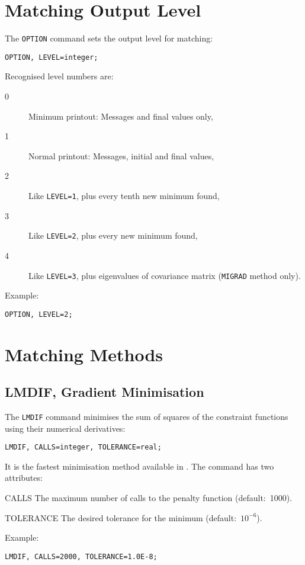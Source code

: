 \section{Matching Output Level}
\label{sec:matchoption}
The \texttt{OPTION} command sets the output level for matching:
\begin{verbatim}
OPTION, LEVEL=integer;
\end{verbatim}
Recognised level numbers are:
\begin{description}
\item[0]
Minimum printout: Messages and final values only,
\item[1]
Normal printout: Messages, initial and final values,
\item[2]
Like \texttt{LEVEL=1}, plus every tenth new minimum found,
\item[3]
Like \texttt{LEVEL=2}, plus every new minimum found,
\item[4]
Like \texttt{LEVEL=3}, plus eigenvalues of covariance matrix
(\texttt{MIGRAD} method only).
\end{description}
Example:
\begin{verbatim}
OPTION, LEVEL=2;
\end{verbatim}
 
\section{Matching Methods}
\label{sec:matchmethod}

\subsection{LMDIF, Gradient Minimisation}
The \texttt{LMDIF} command minimises the sum of squares of the constraint
functions using their numerical derivatives:
\begin{verbatim}
LMDIF, CALLS=integer, TOLERANCE=real;
\end{verbatim}
It is the fastest minimisation method available in \opal.
The command has two attributes:
\begin{description}
\item{CALLS}
  The maximum number of calls to the penalty function (default:~1000).
\item{TOLERANCE}
  The desired tolerance for the minimum (default:~\(10^{-6}\)).
\end{description}
Example:
\begin{verbatim}
LMDIF, CALLS=2000, TOLERANCE=1.0E-8;
\end{verbatim}

